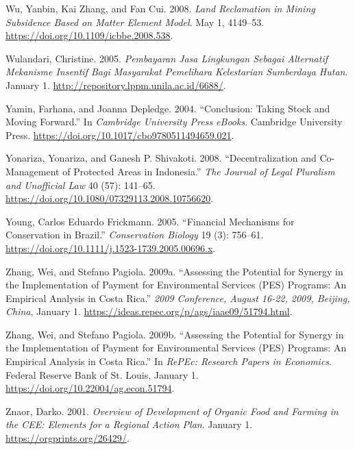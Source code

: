 \begin{CSLReferences}{1}{1}
Wu, Yanbin, Kai Zhang, and Fan Cui. 2008. \emph{Land Reclamation in
Mining Subsidence Based on Matter Element Model}. May 1, 4149--53.
\url{https://doi.org/10.1109/icbbe.2008.538}.

Wulandari, Christine. 2005. \emph{Pembayaran Jasa Lingkungan Sebagai
Alternatif Mekanisme Insentif Bagi Masyarakat Pemelihara Kelestarian
Sumberdaya Hutan}. January 1.
\url{http://repository.lppm.unila.ac.id/6688/}.

Yamin, Farhana, and Joanna Depledge. 2004. {``Conclusion: Taking Stock
and Moving Forward.''} In \emph{Cambridge University Press eBooks}.
Cambridge University Press.
\url{https://doi.org/10.1017/cbo9780511494659.021}.

Yonariza, Yonariza, and Ganesh P. Shivakoti. 2008. {``Decentralization
and Co-Management of Protected Areas in Indonesia.''} \emph{The Journal
of Legal Pluralism and Unofficial Law} 40 (57): 141--65.
\url{https://doi.org/10.1080/07329113.2008.10756620}.

Young, Carlos Eduardo Frickmann. 2005. {``Financial Mechanisms for
Conservation in Brazil.''} \emph{Conservation Biology} 19 (3): 756--61.
\url{https://doi.org/10.1111/j.1523-1739.2005.00696.x}.

Zhang, Wei, and Stefano Pagiola. 2009a. {``Assessing the Potential for
Synergy in the Implementation of Payment for Environmental Services
(PES) Programs: An Empirical Analysis in Costa Rica.''} \emph{2009
Conference, August 16-22, 2009, Beijing, China}, January 1.
\url{https://ideas.repec.org/p/ags/iaae09/51794.html}.

Zhang, Wei, and Stefano Pagiola. 2009b. {``Assessing the Potential for
Synergy in the Implementation of Payment for Environmental Services
(PES) Programs: An Empirical Analysis in Costa Rica.''} In \emph{RePEc:
Research Papers in Economics}. Federal Reserve Bank of St. Louis,
January 1. \url{https://doi.org/10.22004/ag.econ.51794}.

Znaor, Darko. 2001. \emph{Overview of Development of Organic Food and
Farming in the CEE: Elements for a Regional Action Plan}. January 1.
\url{https://orgprints.org/26429/}.


\end{CSLReferences}
